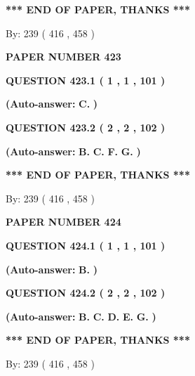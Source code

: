 \documentclass[12pt]{article}
\begin{document}
 
   
   
\vspace{1.0in} 
{\textbf{\large{ *** END OF PAPER, THANKS *** }}} 
   
   
\hspace{1.0in} By: 
 239 ( 416 ,  458 )
   
   
   
   
\newpage 
\setcounter{page}{ 
   423001 } 
   
   
 {\textbf{ \Large{ PAPER NUMBER  423  }}}
   
   
  
  
{\textbf{\large{QUESTION
423.1 
 ( 1 , 1 , 101 )
}}}
 
 
{\textbf{(Auto-answer:}}
{\textbf{\large{
C.}}}
{\textbf{)}}
 
 
  
  
{\textbf{\large{QUESTION
423.2 
 ( 2 , 2 , 102 )
}}}
 
 
{\textbf{(Auto-answer:}}
{\textbf{\large{
B.}}}
{\textbf{\large{
C.}}}
{\textbf{\large{
F.}}}
{\textbf{\large{
G.}}}
{\textbf{)}}
 
 
   
   
\vspace{1.0in} 
{\textbf{\large{ *** END OF PAPER, THANKS *** }}} 
   
   
\hspace{1.0in} By: 
 239 ( 416 ,  458 )
   
   
   
   
\newpage 
\setcounter{page}{ 
   424001 } 
   
   
 {\textbf{ \Large{ PAPER NUMBER  424  }}}
   
   
  
  
{\textbf{\large{QUESTION
424.1 
 ( 1 , 1 , 101 )
}}}
 
 
{\textbf{(Auto-answer:}}
{\textbf{\large{
B.}}}
{\textbf{)}}
 
 
  
  
{\textbf{\large{QUESTION
424.2 
 ( 2 , 2 , 102 )
}}}
 
 
{\textbf{(Auto-answer:}}
{\textbf{\large{
B.}}}
{\textbf{\large{
C.}}}
{\textbf{\large{
D.}}}
{\textbf{\large{
E.}}}
{\textbf{\large{
G.}}}
{\textbf{)}}
 
 
   
   
\vspace{1.0in} 
{\textbf{\large{ *** END OF PAPER, THANKS *** }}} 
   
   
\hspace{1.0in} By: 
 239 ( 416 ,  458 )
   
\end{document}
